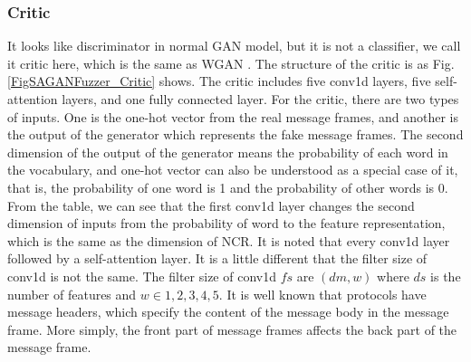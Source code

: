 \subsubsection{\textbf{Critic}}
It looks like discriminator in normal GAN model, but it is not a classifier, we call it critic here, which is the same as WGAN \cite{arjovsky2017wasserstein}. The structure of the critic is as Fig. \ref{FigSAGANFuzzer_Critic} shows. The critic includes five conv1d layers, five self-attention layers, and one fully connected layer. For the critic, there are two types of inputs. One is the one-hot vector from the real message frames, and another is the output of the generator which represents the fake message frames. 
The second dimension of the output of the generator means the probability of each word in the vocabulary, and one-hot vector can also be understood as a special case of it, that is, the probability of one word is 1 and the probability of other words is 0. From the table, we can see that the first conv1d layer changes the second dimension of inputs from the probability of word to the feature representation, which is the same as the dimension of NCR.
It is noted that every conv1d layer followed by a self-attention layer. It is a little different that the filter size of conv1d is not the same. The filter size of conv1d $fs$ are $(dm, w)$ where $ds$ is the number of features and $w \in {1,2,3,4,5}$. It is well known that protocols have message headers, which specify the content of the message body in the message frame. More simply, the front part of message frames affects the back part of the message frame. 

